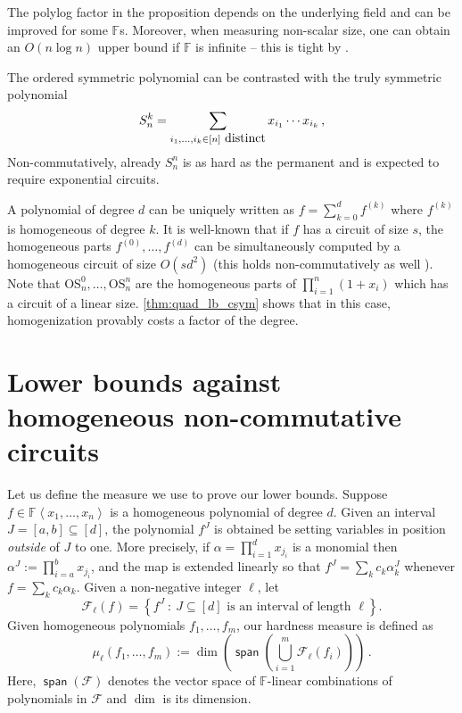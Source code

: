 \documentclass[10pt,a4paper]{article}
\def\Field{\mathbb{F}}
\let\F\Field
\def\inbrace#1{\left\{ #1 \right\}}
\def\inangle#1{\left\langle #1 \right\rangle}
\def\setdef#1#2{\inbrace{ #1 \ : \ #2}}      %
\newcommand{\spn}{\operatorname{\mathsf{span}}}
\renewcommand{\fam}{\textbf{$\mathcal{F}$}}
\newcommand{\esym}[2]{\mathrm{OS}_{#1}^{#2}}
\begin{document}
The polylog factor in the proposition depends on the underlying field and can be improved for some $\F$s. 
Moreover, when measuring non-scalar size, one can obtain an $O(n\log n)$ upper bound if $\F$ is infinite -- this is tight by \cite{BS83}. 
 
The ordered symmetric polynomial can be contrasted with the truly symmetric polynomial 
\[ 
  S^k_n= \sum_{i_1, \dots, i_k\in [n]\hbox { distinct}} x_{i_1}\cdots x_{i_k}\,,
\]
Non-commutatively, already $S_{n}^n$ is as hard as the permanent \cite{HWY11} and is expected to require exponential circuits. 

\begin{remark} 
  A polynomial of degree $d$ can be uniquely written as $f=\sum_{k=0}^df^{(k)}$ where $f^{(k)}$ is homogeneous of degree $k$. 
  It is well-known that if $f$ has a circuit of size $s$, the homogeneous parts $f^{(0)},\dots, f^{(d)}$ can be simultaneously computed by a homogeneous circuit of size $O(sd^2)$ (this holds non-commutatively as well \cite{HWY11}). 
  Note that $\esym{n}{0},\dots, \esym{n}{n}$ are the homogeneous parts of $\prod_{i=1}^n (1+x_i)$ which has a circuit of a linear size. 
  \autoref{thm:quad_lb_csym} shows that in this case, homogenization provably costs a factor of the degree.      
\end{remark}


\section{Lower bounds against homogeneous non-commutative circuits}

Let us define the measure we use to prove our lower bounds.
Suppose $f \in \F \inangle{x_1, \ldots, x_n}$ is a homogeneous polynomial of degree $d$. 
Given an interval $J= [a,b]\subseteq [d]$, the polynomial $f^J$ is obtained be setting variables in position \emph{outside} of $J$ to one. 
More precisely, if $\alpha=\prod_{i=1}^d x_{j_i}$ is a monomial then $\alpha^J:= \prod_{i=a}^b x_{j_i}$, and the map is extended linearly so that $f^J= \sum_k c_k \alpha_k^J $ whenever $f= \sum_k c_k \alpha_k$. 
Given a non-negative integer $\ell$, let 
\[
  \fam_\ell(f) = \setdef{f^J}{J \subseteq [d] \text{ is an interval of length } \ell}.
\]
Given homogeneous polynomials $f_1,\dots, f_m$, our hardness measure is defined as 
\[
 \mu_\ell(f_1,\dots,f_m) := \dim(\spn(\bigcup_{i=1}^m \fam_\ell(f_i)))\,.
\]
Here, $\spn(\fam)$ denotes the vector space of $\F$-linear combinations of polynomials in $\fam$ and $\dim$ is its dimension. 
\end{document}
